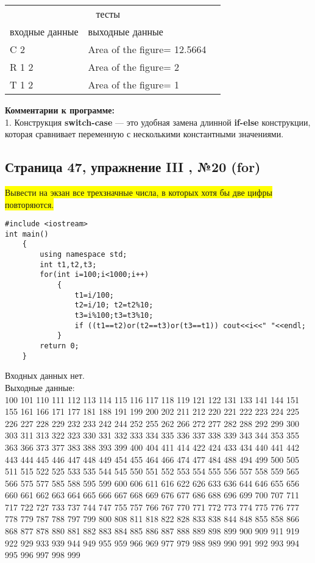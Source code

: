 \documentclass[11pt]{article}
\begin{document}
\begin{flushleft}
\begin{table}[h]\begin{center}\begin{tabular}{|l|l|l}
\cline{1-2}
\multicolumn{2}{|c|}{тесты} &  \\ \cline{1-2}
     входные данные      &       выходные данные    &  \\ \cline{1-2}
C 2  &Area of the figure= 12.5664&  \\ \cline{1-2}
R 1 2  &Area of the figure= 2&  \\ \cline{1-2}
T 1 2  &Area of the figure= 1&  \\ \cline{1-2}
\end{tabular}\end{center}\end{table}

\textbf{Комментарии к программе:} \\
1. Конструкция \textbf{switch-case} — это удобная замена длинной \textbf{if-else} конструкции, которая сравнивает переменную с несколькими константными значениями.\\


\newpage
\begin{center}
\section{Страница 47, упражнение III , №20 (for)}
\colorbox{yellow}{Вывести на экзан все трехзначные числа, в которых хотя бы две цифры повторяются.}
 \end{center}
\begin{lstlisting}
#include <iostream>
int main()
	{
		using namespace std;
		int t1,t2,t3;
		for(int i=100;i<1000;i++)
			{
				t1=i/100;
				t2=i/10; t2=t2%10;
				t3=i%100;t3=t3%10;
				if ((t1==t2)or(t2==t3)or(t3==t1)) cout<<i<<" "<<endl;
			}
		return 0;
	}
\end{lstlisting}

\begin{center}Входных данных нет.\\ Выходные данные:\\
100 101 110 111 112 113 114 115 116 117 118 119 121 122 131 133 141 144 151 155 161 166 171 177 181 188 191 199 200 202 211 212 220 221 222 223 224 225 226 227 228 229 232 233 242 244 252 255 262 266 272 277 282 288 292 299 300 303 311 313 322 323 330 331 332 333 334 335 336 337 338 339 343 344 353 355 363 366 373 377 383 388 393 399 400 404 411 414 422 424 433 434 440 441 442 443 444 445 446 447 448 449 454 455 464 466 474 477 484 488 494 499 500 505 511 515 522 525 533 535 544 545 550 551 552 553 554 555 556 557 558 559 565 566 575 577 585 588 595 599 600 606 611 616 622 626 633 636 644 646 655 656 660 661 662 663 664 665 666 667 668 669 676 677 686 688 696 699 700 707 711 717 722 727 733 737 744 747 755 757 766 767 770 771 772 773 774 775 776 777 778 779 787 788 797 799 800 808 811 818 822 828 833 838 844 848 855 858 866 868 877 878 880 881 882 883 884 885 886 887 888 889 898 899 900 909 911 919 922 929 933 939 944 949 955 959 966 969 977 979 988 989 990 991 992 993 994 995 996 997 998 999 \end{center}


\end{flushleft}
\end{document}
